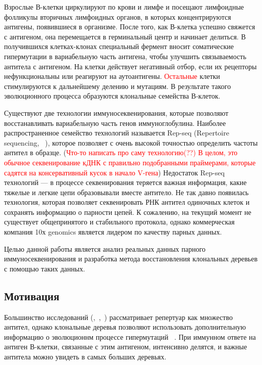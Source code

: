 \documentclass{spbau-diploma}
\newcommand{\todo}{\textcolor{red}}
\begin{document}
Взрослые В-клетки циркулируют по крови и лимфе и посещают лимфоидные фолликулы вторичных лимфоидных органов, в которых концентрируются антигены, появившиеся в организме. 
После того, как В-клетка успешно свяжется с антигеном, она перемещается в герминальный центр и начинает делиться.
В получившихся клетках-клонах специальный фермент вносит соматические гипермутации в вариабельную часть антигена, чтобы улучшить связываемость антитела с антигеном.
На клетки действует негативный отбор, если их рецепторы нефункциональны или реагируют на аутоантигены.
\todo{Остальные} клетки стимулируются к дальнейшему делению и мутациям.
В результате такого эволюционного процесса образуются клональные семейства В-клеток. 


Существуют две технологии иммуносеквенирования, которые позволяют восстанавливать вариабельную часть генов иммуноглобулина.
Наиболее распространенное семейство технологий называется Rep-seq (Repertoire sequencing, ~\cite{pmid22043864}), которое позволяет с очень высокой точностью определить частоты антител в образце.
(\todo{Что-то написать про саму технологию(??)
В целом, это обычное секвенирование кДНК с правильно подобранными праймерами, которые садятся на консервативный кусок в начало V-гена})
Недостаток Rep-seq технологий --- в процессе секвенирования теряется важная информация, какие тяжелые и легкие цепи образовывали вместе антитело.
Не так давно появилась технология, которая позволяет секвенировать РНК антител одиночных клеток и сохранять информацию о парности цепей. 
К сожалению, на текущий момент не существует общепринятого и стабильного протокола, однако коммерческая компания 10х genomics является лидером по качеству парных данных.


Целью данной работы является анализ реальных данных парного иммуносеквенирования и разработка метода восстановления клональных деревьев с помощью таких данных.




\subsection{Мотивация}

Большинство исследований (\cite{warren2013high},~\cite{jackson2014human},~\cite{logan2011high}) рассматривает репертуар как множество антител, однако клональные деревья позволяют использовать дополнительную информацию о эволюционнм процессе гипермутаций ~\cite{miho2017fundamental}.
При иммунном ответе на антиген В-клетки, связанные с этим антигеном, интенсивно делятся, и важные антитела можно увидеть в самых больших деревьях.
\end{document}
